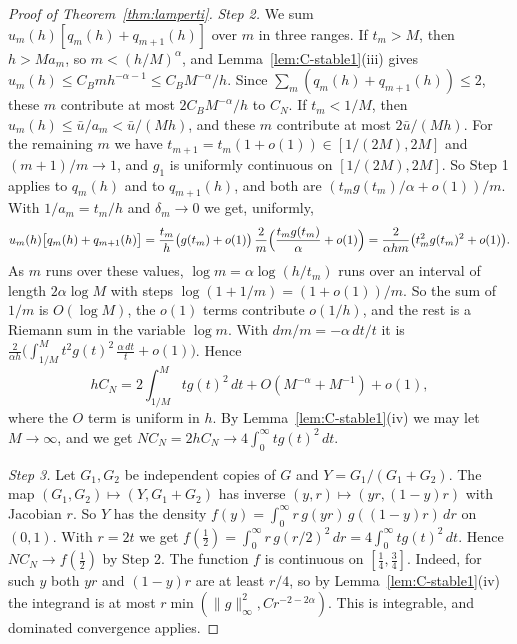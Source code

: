 \begin{proof}[Proof of Theorem~\ref{thm:lamperti}]
\emph{Step 2.} We sum $u_m(h)[q_m(h)+q_{m+1}(h)]$ over $m$ in three ranges. If $t_m>M$,
then $h>Ma_m$, so $m<(h/M)^\alpha$, and Lemma~\ref{lem:C-stable1}(iii) gives
$u_m(h)\le C_Bmh^{-\alpha-1}\le C_BM^{-\alpha}/h$. Since
$\sum_m(q_m(h)+q_{m+1}(h))\le2$, these $m$ contribute at most $2C_BM^{-\alpha}/h$ to
$C_N$. If $t_m<1/M$, then $u_m(h)\le\bar u/a_m<\bar u/(Mh)$, and these $m$ contribute at
most $2\bar u/(Mh)$. For the remaining $m$ we have $t_{m+1}=t_m(1+o(1))\in[1/(2M),2M]$
and $(m+1)/m\to1$, and $g_1$ is uniformly continuous on $[1/(2M),2M]$. So Step 1 applies
to $q_m(h)$ and to $q_{m+1}(h)$, and both are $(t_mg(t_m)/\alpha+o(1))/m$. With
$1/a_m=t_m/h$ and $\delta_m\to0$ we get, uniformly,
\[
u_m(h)\bigl[q_m(h)+q_{m+1}(h)\bigr]
=\frac{t_m}h\bigl(g(t_m)+o(1)\bigr)\,\frac2m\Bigl(\frac{t_mg(t_m)}\alpha+o(1)\Bigr)
=\frac2{\alpha hm}\bigl(t_m^2g(t_m)^2+o(1)\bigr).
\]
As $m$ runs over these values, $\log m=\alpha\log(h/t_m)$ runs over an interval of
length $2\alpha\log M$ with steps $\log(1+1/m)=(1+o(1))/m$. So the sum of $1/m$ is
$O(\log M)$, the $o(1)$ terms contribute $o(1/h)$, and the rest is a Riemann sum in the
variable $\log m$. With $dm/m=-\alpha\,dt/t$ it is
$\frac2{\alpha h}\bigl(\int_{1/M}^Mt^2g(t)^2\,\frac{\alpha\,dt}t+o(1)\bigr)$. Hence
\[
hC_N=2\int_{1/M}^Mtg(t)^2\,dt+O(M^{-\alpha}+M^{-1})+o(1),
\]
where the $O$ term is uniform in $h$. By Lemma~\ref{lem:C-stable1}(iv) we may let
$M\to\infty$, and we get $NC_N=2hC_N\to4\int_0^\infty tg(t)^2\,dt$.

\emph{Step 3.} Let $G_1,G_2$ be independent copies of $G$ and $Y=G_1/(G_1+G_2)$. The map
$(G_1,G_2)\mapsto(Y,G_1+G_2)$ has inverse $(y,r)\mapsto(yr,(1-y)r)$ with Jacobian $r$. So
$Y$ has the density $f(y)=\int_0^\infty r\,g(yr)\,g((1-y)r)\,dr$ on $(0,1)$. With $r=2t$
we get $f(\frac12)=\int_0^\infty r\,g(r/2)^2\,dr=4\int_0^\infty tg(t)^2\,dt$. Hence
$NC_N\to f(\frac12)$ by Step 2. The function $f$ is continuous on
$[\frac14,\frac34]$. Indeed, for such $y$ both $yr$ and $(1-y)r$ are at least $r/4$, so
by Lemma~\ref{lem:C-stable1}(iv) the integrand is at most
$r\min(\lVert g\rVert_\infty^2,Cr^{-2-2\alpha})$. This is integrable, and dominated
convergence applies.


\end{proof}
